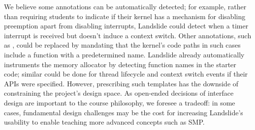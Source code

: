 We believe some annotations can be automatically detected;
for example, rather than requiring students to indicate if their kernel has a mechanism for disabling preemption apart from disabling interrupts, Landslide could detect when a timer interrupt is received but doesn't induce a context switch.
Other annotations, such as , could be replaced by mandating that the kernel's code paths in such cases include a function with a predetermined name.
Landslide already automatically instruments the memory allocator by detecting function names in the starter code; similar could be done for thread lifecycle and context switch events if their APIs were specified.
However, prescribing such templates has the downside of constraining the project's design space.
As open-ended decisions of interface design are important to the course philosophy, we foresee a tradeoff: in some cases, fundamental design challenges may be the cost for increasing Landslide's usability to enable teaching more advanced concepts such as SMP.





